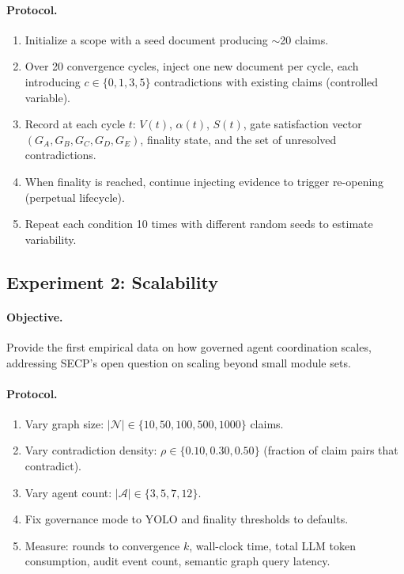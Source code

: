 \documentclass[11pt]{article}
\begin{document}
\paragraph{Protocol.}
\begin{enumerate}
  \item Initialize a scope with a seed document producing $\sim$20 claims.
  \item Over 20 convergence cycles, inject one new document per cycle, each introducing $c \in \{0, 1, 3, 5\}$ contradictions with existing claims (controlled variable).
  \item Record at each cycle $t$: $V(t)$, $\alpha(t)$, $S(t)$, gate satisfaction vector $(G_A, G_B, G_C, G_D, G_E)$, finality state, and the set of unresolved contradictions.
  \item When finality is reached, continue injecting evidence to trigger re-opening (perpetual lifecycle).
  \item Repeat each condition 10 times with different random seeds to estimate variability.
\end{enumerate}

\subsection{Experiment 2: Scalability}

\paragraph{Objective.} Provide the first empirical data on how governed agent coordination scales, addressing SECP's open question on scaling beyond small module sets.

\paragraph{Protocol.}
\begin{enumerate}
  \item Vary graph size: $|\mathcal{N}| \in \{10, 50, 100, 500, 1000\}$ claims.
  \item Vary contradiction density: $\rho \in \{0.10, 0.30, 0.50\}$ (fraction of claim pairs that contradict).
  \item Vary agent count: $|\mathcal{A}| \in \{3, 5, 7, 12\}$.
  \item Fix governance mode to YOLO and finality thresholds to defaults.
  \item Measure: rounds to convergence $k$, wall-clock time, total LLM token consumption, audit event count, semantic graph query latency.
\end{enumerate}
\end{document}
